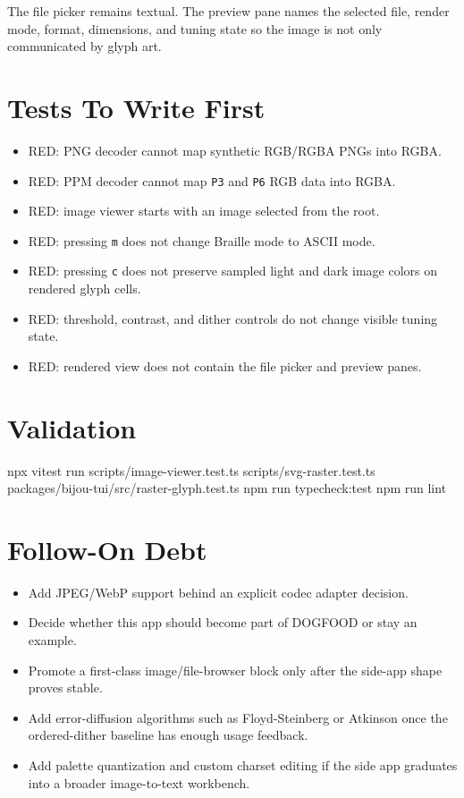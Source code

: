 The file picker remains textual. The preview pane names the selected file, render mode, format, dimensions, and tuning state so the image is not only communicated by glyph art.

\section{Tests To Write First}\label{record-137-tests-to-write-first}

\begin{itemize}
\tightlist
\item
  RED: PNG decoder cannot map synthetic RGB/RGBA PNGs into RGBA.
\item
  RED: PPM decoder cannot map \texttt{P\allowbreak{}3} and \texttt{P\allowbreak{}6} RGB data into RGBA.
\item
  RED: image viewer starts with an image selected from the root.
\item
  RED: pressing \texttt{m} does not change Braille mode to ASCII mode.
\item
  RED: pressing \texttt{c} does not preserve sampled light and dark image colors on rendered glyph cells.
\item
  RED: threshold, contrast, and dither controls do not change visible tuning state.
\item
  RED: rendered view does not contain the file picker and preview panes.
\end{itemize}

\section{Validation}\label{record-137-validation}

\begin{CodeBlock}
npx vitest run scripts/image-viewer.test.ts scripts/svg-raster.test.ts packages/bijou-tui/src/raster-glyph.test.ts
npm run typecheck:test
npm run lint
\end{CodeBlock}

\section{Follow-On Debt}\label{record-137-follow-on-debt}

\begin{itemize}
\tightlist
\item
  Add JPEG/WebP support behind an explicit codec adapter decision.
\item
  Decide whether this app should become part of DOGFOOD or stay an example.
\item
  Promote a first-class image/file-browser block only after the side-app shape proves stable.
\item
  Add error-diffusion algorithms such as Floyd-Steinberg or Atkinson once the ordered-dither baseline has enough usage feedback.
\item
  Add palette quantization and custom charset editing if the side app graduates into a broader image-to-text workbench.
\end{itemize}

